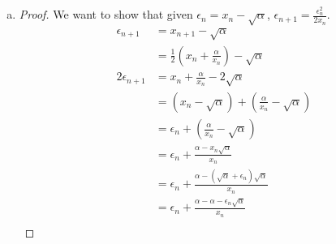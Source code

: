 \documentclass[11pt]{article}
\begin{document}
\begin{exercise}{16}
\begin{solution}
\begin{enumerate} [(a)]
\begin{proof}
            Now, to find the limit, we let $\lim_{n \to \infty} x_n = L$. Then by definition, $\lim_{n \to \infty} x_{n + 1} = L$. Taking the limit on both sides of the recursion gives \begin{equation*}
                \begin{split}
                    \lim_{n \to \infty} x_{n + 1} & = \lim_{n \to \infty} \frac{1}{2} \left( x_n + \frac{\alpha}{x_n} \right) \\
                    L & = \frac{1}{2} \left( L + \frac{\alpha}{L} \right) \\
                    2L & = L + \frac{\alpha}{L} \\
                    L^2 & = \alpha \\
                    L & = \sqrt{\alpha} \\
                    \lim_{n \to \infty} x_n & = \sqrt{\alpha}
                \end{split}
            \end{equation*}
            Thus we have shown that $\{ x_n \}$ decreases monotonically and that $\lim x_n = \sqrt{\alpha}$. 
        \end{proof}
        \item \begin{proof} We want to show that given $\epsilon_n = x_n - \sqrt{\alpha}$, $\epsilon_{n+1} = \frac{\epsilon_n^2}{2x_n}$. 
            \begin{equation*}
                \begin{split}
                    \epsilon_{n+1} & = x_{n+1} - \sqrt{\alpha} \\
                    & = \frac{1}{2} \left( x_n + \frac{\alpha}{x_n} \right) - \sqrt{\alpha} \\
                    2 \epsilon_{n+1} & = x_n + \frac{\alpha}{x_n} - 2 \sqrt{\alpha} \\
                    & = (x_n - \sqrt{\alpha}) + \left( \frac{\alpha}{x_n} - \sqrt{\alpha} \right) \\
                    & = \epsilon_n + \left( \frac{\alpha}{x_n} - \sqrt{\alpha} \right) \\
                    & = \epsilon_n + \frac{\alpha - x_n \sqrt{\alpha}}{x_n} \\
                    & = \epsilon_n + \frac{\alpha - (\sqrt{\alpha} + \epsilon_n) \sqrt{\alpha}}{x_n} \\
                    & = \epsilon_n + \frac{\alpha - \alpha - \epsilon_n \sqrt{\alpha}}{x_n} \\

\end{split}
\end{equation*}
\end{proof}
\end{enumerate}
\end{solution}
\end{exercise}
\end{document}
